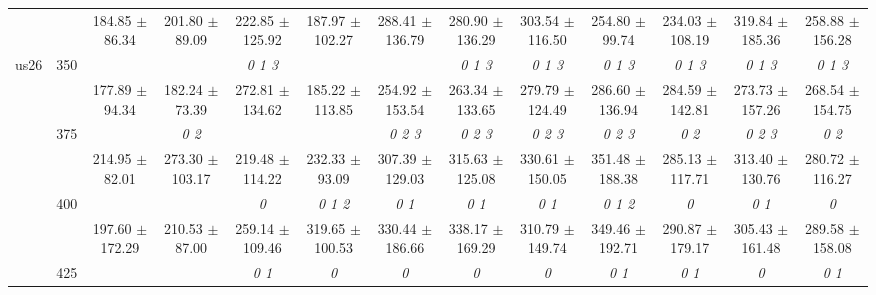 \begin{table}[h]
{\begin{tabular}{
        ccccccccccccc}
 & & \cellcolor[HTML]{EFEFEF} 184.85 $\pm$ 86.34& \cellcolor[HTML]{EFEFEF} 201.80 $\pm$ 89.09& \cellcolor[HTML]{EFEFEF} 222.85 $\pm$ 125.92& \cellcolor[HTML]{EFEFEF} 187.97 $\pm$ 102.27& \cellcolor[HTML]{EFEFEF} 288.41 $\pm$ 136.79& \cellcolor[HTML]{EFEFEF} 280.90 $\pm$ 136.29& \cellcolor[HTML]{EFEFEF} 303.54 $\pm$ 116.50& \cellcolor[HTML]{EFEFEF} 254.80 $\pm$ 99.74& \cellcolor[HTML]{EFEFEF} 234.03 $\pm$ 108.19& \cellcolor[HTML]{EFEFEF} 319.84 $\pm$ 185.36& \cellcolor[HTML]{EFEFEF} 258.88 $\pm$ 156.28 \\ 
 \multirow{4}{*}{us26} & \multirow{2}{*}{350}& & & \textit{ 0 1 3 }& & & \textit{ 0 1 3 }& \textit{ 0 1 3 }& \textit{ 0 1 3 }& \textit{ 0 1 3 }& \textit{ 0 1 3 }& \textit{ 0 1 3 } \\ 
 & & 177.89 $\pm$ 94.34& 182.24 $\pm$ 73.39& 272.81 $\pm$ 134.62& 185.22 $\pm$ 113.85& 254.92 $\pm$ 153.54& 263.34 $\pm$ 133.65& 279.79 $\pm$ 124.49& 286.60 $\pm$ 136.94& 284.59 $\pm$ 142.81& 273.73 $\pm$ 157.26& 268.54 $\pm$ 154.75 \\ 
 & \multirow{2}{*}{375}& \cellcolor[HTML]{EFEFEF} & \cellcolor[HTML]{EFEFEF} \textit{ 0 2 }& \cellcolor[HTML]{EFEFEF} & \cellcolor[HTML]{EFEFEF} & \cellcolor[HTML]{EFEFEF} \textit{ 0 2 3 }& \cellcolor[HTML]{EFEFEF} \textit{ 0 2 3 }& \cellcolor[HTML]{EFEFEF} \textit{ 0 2 3 }& \cellcolor[HTML]{EFEFEF} \textit{ 0 2 3 }& \cellcolor[HTML]{EFEFEF} \textit{ 0 2 }& \cellcolor[HTML]{EFEFEF} \textit{ 0 2 3 }& \cellcolor[HTML]{EFEFEF} \textit{ 0 2 } \\ 
 & & \cellcolor[HTML]{EFEFEF} 214.95 $\pm$ 82.01& \cellcolor[HTML]{EFEFEF} 273.30 $\pm$ 103.17& \cellcolor[HTML]{EFEFEF} 219.48 $\pm$ 114.22& \cellcolor[HTML]{EFEFEF} 232.33 $\pm$ 93.09& \cellcolor[HTML]{EFEFEF} 307.39 $\pm$ 129.03& \cellcolor[HTML]{EFEFEF} 315.63 $\pm$ 125.08& \cellcolor[HTML]{EFEFEF} 330.61 $\pm$ 150.05& \cellcolor[HTML]{EFEFEF} 351.48 $\pm$ 188.38& \cellcolor[HTML]{EFEFEF} 285.13 $\pm$ 117.71& \cellcolor[HTML]{EFEFEF} 313.40 $\pm$ 130.76& \cellcolor[HTML]{EFEFEF} 280.72 $\pm$ 116.27 \\ 
 & \multirow{2}{*}{400}& & & \textit{ 0 }& \textit{ 0 1 2 }& \textit{ 0 1 }& \textit{ 0 1 }& \textit{ 0 1 }& \textit{ 0 1 2 }& \textit{ 0 }& \textit{ 0 1 }& \textit{ 0 } \\ 
 & & 197.60 $\pm$ 172.29& 210.53 $\pm$ 87.00& 259.14 $\pm$ 109.46& 319.65 $\pm$ 100.53& 330.44 $\pm$ 186.66& 338.17 $\pm$ 169.29& 310.79 $\pm$ 149.74& 349.46 $\pm$ 192.71& 290.87 $\pm$ 179.17& 305.43 $\pm$ 161.48& 289.58 $\pm$ 158.08 \\ 
 & \multirow{2}{*}{425}& \cellcolor[HTML]{EFEFEF} & \cellcolor[HTML]{EFEFEF} & \cellcolor[HTML]{EFEFEF} \textit{ 0 1 }& \cellcolor[HTML]{EFEFEF} \textit{ 0 }& \cellcolor[HTML]{EFEFEF} \textit{ 0 }& \cellcolor[HTML]{EFEFEF} \textit{ 0 }& \cellcolor[HTML]{EFEFEF} \textit{ 0 }& \cellcolor[HTML]{EFEFEF} \textit{ 0 1 }& \cellcolor[HTML]{EFEFEF} \textit{ 0 1 }& \cellcolor[HTML]{EFEFEF} \textit{ 0 }& \cellcolor[HTML]{EFEFEF} \textit{ 0 1 } \\ 

\end{tabular}}
\end{table}
